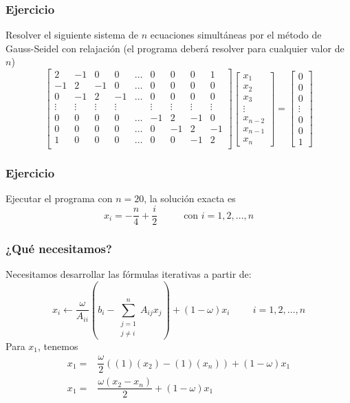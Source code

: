 \begin{frame}
\frametitle{Ejercicio}
\fontsize{12}{12}\selectfont
Resolver el siguiente sistema de $n$ ecuaciones simultáneas por el método de Gauss-Seidel con relajación (el programa deberá resolver para cualquier valor de $n$)
\fontsize{11}{11}\selectfont
\[ \begin{bmatrix}
2 & -1 & 0 & 0 & \ldots & 0 & 0 & 0 & 1 \\
-1 & 2 & -1 & 0 & \ldots & 0 & 0 & 0 & 0 \\
0 & -1 & 2 & -1 & \ldots & 0 & 0 & 0 & 0 \\
\vdots & \vdots & \vdots & \vdots & & \vdots & \vdots & \vdots & \vdots \\
0 & 0 & 0 & 0 & \ldots & -1 & 2 & -1 & 0 \\
0 & 0 & 0 & 0 & \ldots & 0 & -1 & 2 & -1 \\
1 & 0 & 0 & 0 & \ldots & 0 & 0 & -1 & 2 \\
\end{bmatrix}
\begin{bmatrix}
x_{1} \\
x_{2} \\
x_{3} \\
\vdots \\
x_{n-2} \\
x_{n-1} \\
x_{n} 
\end{bmatrix} = 
\begin{bmatrix}
0 \\
0 \\
0 \\
\vdots \\
0 \\
0 \\
1 
\end{bmatrix} \]
\end{frame}
\begin{frame}
\frametitle{Ejercicio}
Ejecutar el programa con $n=20$, la solución exacta es
\[ x_{i} = - \dfrac{n}{4} + \dfrac{i}{2} \hspace{1cm} \mbox{ con } i = 1, 2, \ldots, n \]
\end{frame}
\begin{frame}
\frametitle{¿Qué necesitamos?}
Necesitamos desarrollar las fórmulas iterativas a partir de:
\[  x_{i}\leftarrow \dfrac{\omega}{A_{ii}} \left( b_{i} - \sum_{\substack{ j=1 \\ j \neq i}}^{n} A_{ij} x_{j} \right) + (1 - \omega) x_{i} \hspace{1cm} i=1,2,\ldots,n \]
Para $x_{1}$, tenemos
\[ \begin{split}
x_{1} =& \dfrac{\omega}{2} \left( (1)(x_{2})-(1)(x_{n}) \right) + (1-\omega)x_{1} \\
x_{1} =& \dfrac{\omega(x_{2}-x_{n})}{2} + (1 - \omega)x_{1}
\end{split} \]
\end{frame}
